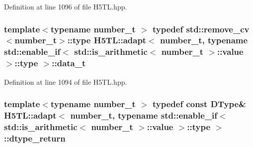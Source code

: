 Definition at line 1096 of file H5\-T\-L.\-hpp.

\hypertarget{struct_h5_t_l_1_1adapt_3_01number__t_00_01typename_01std_1_1enable__if_3_01std_1_1is__arithmetic58ffd9dad45132ac3625c2d53f8565f6_af146052bd299f7493cece962909aa436}{
\subsubsection[{data\-\_\-t}]{\setlength{\rightskip}{0pt plus 5cm}template$<$typename number\-\_\-t $>$ typedef std\-::remove\-\_\-cv$<$number\-\_\-t$>$\-::type {\bf H5\-T\-L\-::adapt}$<$ number\-\_\-t, typename std\-::enable\-\_\-if$<$ std\-::is\-\_\-arithmetic$<$ number\-\_\-t $>$\-::value $>$\-::type $>$\-::{\bf data\-\_\-t}}}\label{struct_h5_t_l_1_1adapt_3_01number__t_00_01typename_01std_1_1enable__if_3_01std_1_1is__arithmetic58ffd9dad45132ac3625c2d53f8565f6_af146052bd299f7493cece962909aa436}


Definition at line 1094 of file H5\-T\-L.\-hpp.

\hypertarget{struct_h5_t_l_1_1adapt_3_01number__t_00_01typename_01std_1_1enable__if_3_01std_1_1is__arithmetic58ffd9dad45132ac3625c2d53f8565f6_aa2727e0b2bd78a930fbe64fb65c30030}{
\subsubsection[{dtype\-\_\-return}]{\setlength{\rightskip}{0pt plus 5cm}template$<$typename number\-\_\-t $>$ typedef const {\bf D\-Type}\& {\bf H5\-T\-L\-::adapt}$<$ number\-\_\-t, typename std\-::enable\-\_\-if$<$ std\-::is\-\_\-arithmetic$<$ number\-\_\-t $>$\-::value $>$\-::type $>$\-::{\bf dtype\-\_\-return}}}\label{struct_h5_t_l_1_1adapt_3_01number__t_00_01typename_01std_1_1enable__if_3_01std_1_1is__arithmetic58ffd9dad45132ac3625c2d53f8565f6_aa2727e0b2bd78a930fbe64fb65c30030}


